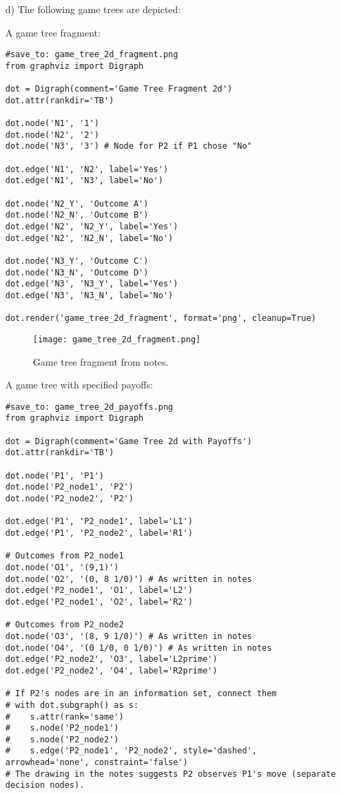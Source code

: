 \begin{enumerate}
    \item[d)] The following game trees are depicted:
    
    A game tree fragment:
\begin{verbatim}
#save_to: game_tree_2d_fragment.png
from graphviz import Digraph

dot = Digraph(comment='Game Tree Fragment 2d')
dot.attr(rankdir='TB')

dot.node('N1', '1')
dot.node('N2', '2')
dot.node('N3', '3') # Node for P2 if P1 chose "No"

dot.edge('N1', 'N2', label='Yes')
dot.edge('N1', 'N3', label='No')

dot.node('N2_Y', 'Outcome A')
dot.node('N2_N', 'Outcome B')
dot.edge('N2', 'N2_Y', label='Yes')
dot.edge('N2', 'N2_N', label='No')

dot.node('N3_Y', 'Outcome C')
dot.node('N3_N', 'Outcome D')
dot.edge('N3', 'N3_Y', label='Yes')
dot.edge('N3', 'N3_N', label='No')

dot.render('game_tree_2d_fragment', format='png', cleanup=True)
\end{verbatim}
    \begin{figure}[H]
    \centering
    \texttt{[image: game\_tree\_2d\_fragment.png]}
    \caption{Game tree fragment from notes.}
    \label{fig:game_tree_2d_fragment}
    \end{figure}

    A game tree with specified payoffs:
\begin{verbatim}
#save_to: game_tree_2d_payoffs.png
from graphviz import Digraph

dot = Digraph(comment='Game Tree 2d with Payoffs')
dot.attr(rankdir='TB')

dot.node('P1', 'P1')
dot.node('P2_node1', 'P2')
dot.node('P2_node2', 'P2')

dot.edge('P1', 'P2_node1', label='L1')
dot.edge('P1', 'P2_node2', label='R1')

# Outcomes from P2_node1
dot.node('O1', '(9,1)')
dot.node('O2', '(0, 8 1/0)') # As written in notes
dot.edge('P2_node1', 'O1', label='L2')
dot.edge('P2_node1', 'O2', label='R2')

# Outcomes from P2_node2
dot.node('O3', '(8, 9 1/0)') # As written in notes
dot.node('O4', '(0 1/0, 0 1/0)') # As written in notes
dot.edge('P2_node2', 'O3', label='L2prime')
dot.edge('P2_node2', 'O4', label='R2prime')

# If P2's nodes are in an information set, connect them
# with dot.subgraph() as s:
#    s.attr(rank='same')
#    s.node('P2_node1')
#    s.node('P2_node2')
#    s.edge('P2_node1', 'P2_node2', style='dashed', arrowhead='none', constraint='false')
# The drawing in the notes suggests P2 observes P1's move (separate decision nodes).


\end{verbatim}
\end{enumerate}
